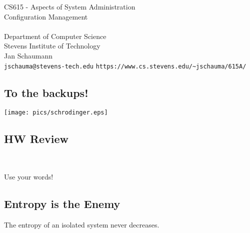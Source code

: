 \documentclass[xga]{xdvislides}
\begin{document}
\setfontphv

\lhead{\slidetitle}                               %
\cfoot{\relax}                               %
\rfoot{\Gray{\today}}

\newcommand{\smallish}{\fontsize{16}{16}\selectfont}

\vspace*{\fill}
\begin{center}
	\Hugesize
		CS615 - Aspects of System Administration\\ [1em]
		Configuration Management\\ [1em]
	\hspace*{5mm}\blueline\\ [1em]
	\Normalsize
		Department of Computer Science\\
		Stevens Institute of Technology\\
		Jan Schaumann\\
		\verb+jschauma@stevens-tech.edu+
		\verb+https://www.cs.stevens.edu/~jschauma/615A/+
\end{center}
\vspace*{\fill}

\subsection{To the backups!}
\vspace*{\fill}
\begin{center}
	\texttt{[image: pics/schrodinger.eps]}
\end{center}
\vspace*{\fill}

\subsection{HW Review}
\\

\vspace{.5in}
\Huge
\begin{center}
Use your words!
\end{center}
\Normalsize

\subsection{Entropy is the Enemy}
\vfill
\Huge
\begin{center}
The entropy of an isolated system never decreases.
\end{center}
\Normalsize
\vfill
\end{document}
